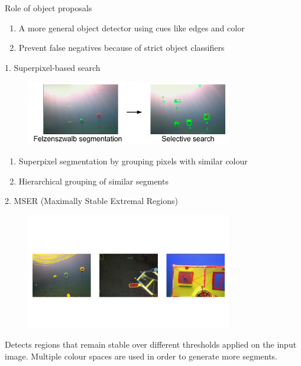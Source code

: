 \documentclass[13pt]{beamer}
\begin{document}
\begin{frame}{Role of object proposals}

  \begin{enumerate}
    \item A more general object detector using cues like edges and color
    \item Prevent false negatives because of strict object classifiers
  \end{enumerate}
\end{frame}

\begin{frame}{1. Superpixel-based search}

  \begin{figure}[ht]
      \centering
      \includegraphics[width=0.8\textwidth, height=0.4\textwidth]{figs/selectivesearch.png}
  \end{figure}

  \begin{enumerate}
    \item Superpixel segmentation by grouping pixels with similar colour
    \item Hierarchical grouping of similar segments
  \end{enumerate}
\end{frame}

\begin{frame}{2. MSER (Maximally Stable Extremal Regions)}

  \begin{figure}[ht]
      \centering
      \includegraphics[width=0.8\textwidth, height=0.5\textwidth]{figs/mserproposal.png}
  \end{figure}

  Detects regions that remain stable over different thresholds applied
  on the input image. Multiple colour spaces are used in order to generate more
  segments.
\end{frame}
\end{document}
